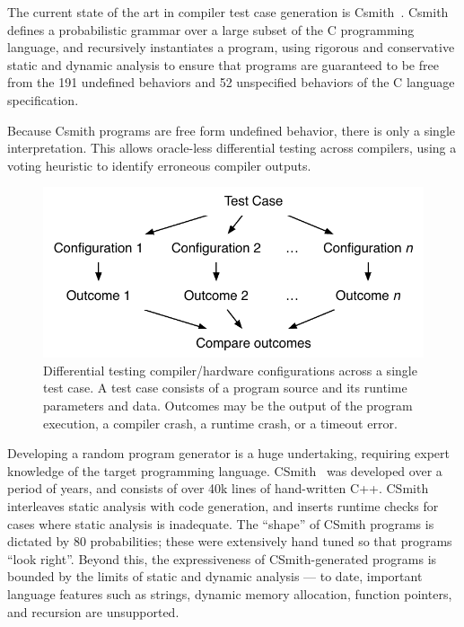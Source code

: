 The current state of the art in compiler test case generation is Csmith~\cite{Yang2011}. Csmith defines a probabilistic grammar over a large subset of the C programming language, and recursively instantiates a program, using rigorous and conservative static and dynamic analysis to ensure that programs are guaranteed to be free from the 191 undefined behaviors and 52 unspecified behaviors of the C language specification.

Because Csmith programs are free form undefined behavior, there is only a single interpretation. This allows oracle-less differential testing across compilers, using a voting heuristic to identify erroneous compiler outputs.

\begin{figure}
	\centering
	\includegraphics[width=.85\columnwidth]{img/difftest} %
	\caption{%
		Differential testing compiler/hardware configurations across a single test case. A test case consists of a program source and its runtime parameters and data. Outcomes may be the output of the program execution, a compiler crash, a runtime crash, or a timeout error.%
	}%
	\label{fig:difftest}
\end{figure}

Developing a random program generator is a huge undertaking, requiring expert knowledge of the target programming language. CSmith~\cite{Yang2011} was developed over a period of years, and consists of over 40k lines of hand-written C++. CSmith interleaves static analysis with code generation, and inserts runtime checks for cases where static analysis is inadequate. The ``shape'' of CSmith programs is dictated by 80 probabilities; these were extensively hand tuned so that programs ``look right''. Beyond this, the expressiveness of CSmith-generated programs is bounded by the limits of static and dynamic analysis --- to date, important language features such as strings, dynamic memory allocation, function pointers, and recursion are unsupported.

